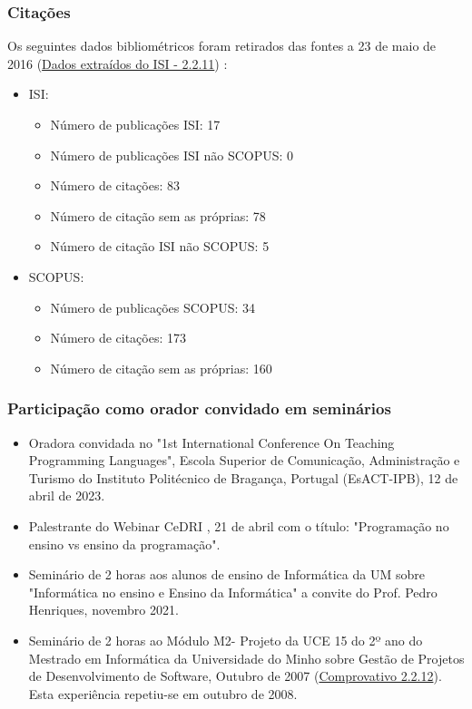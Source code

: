 \documentclass[11pt]{article}
\begin{document}
\subsubsection{Citações}
Os seguintes dados bibliométricos foram retirados das fontes a 23 de maio de 2016 (\href{run:Publicacoes/citacoesISI.pdf}{Dados extraídos do ISI - 2.2.11}) :
\begin{itemize}
\item {ISI:}
\begin{itemize}
\item {Número de publicações ISI: 17}
\item {Número de publicações ISI não SCOPUS: 0}
\item {Número de citações: 83}
\item {Número de citação sem as próprias: 78}
\item {Número de citação ISI não SCOPUS: 5}
\end{itemize}
\item {SCOPUS:}
\begin{itemize}
\item {Número de publicações SCOPUS: 34}
\item {Número de citações: 173}
\item {Número de citação sem as próprias: 160}
\end{itemize}
\end{itemize}


\subsubsection{Participação como orador convidado em seminários}
\begin{itemize}
\item {Oradora convidada no "1st International Conference On Teaching Programming Languages", Escola Superior de Comunicação, Administração e Turismo do Instituto Politécnico de Bragança, Portugal (EsACT-IPB), 12 de abril de 2023.}
\item {Palestrante do Webinar CeDRI , 21 de abril com o título: "Programação no ensino vs ensino da programação".}
\item {Seminário de 2 horas aos alunos de ensino de Informática da UM sobre "Informática no ensino e Ensino da Informática" a convite do Prof. Pedro Henriques, novembro 2021.}
\item {Seminário de 2 horas ao Módulo M2- Projeto da UCE 15 do 2º ano do Mestrado em Informática da Universidade do Minho sobre Gestão de Projetos de Desenvolvimento de Software, Outubro de 2007 (\href{run:MissaoIPBoutros/comunicacaooralUM.pdf}{Comprovativo 2.2.12}). Esta experiência repetiu-se em outubro de 2008.}
\end{itemize}
\end{document}

